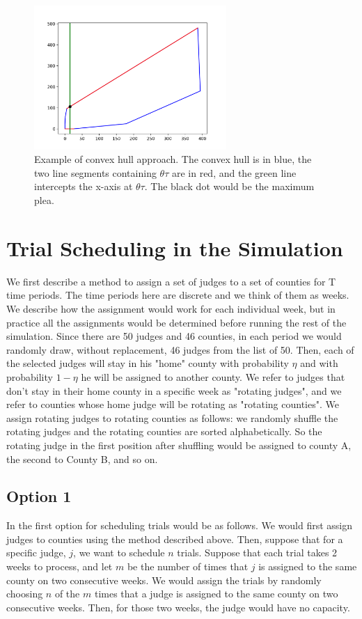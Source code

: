 \documentclass[11pt]{article}
\begin{document}
  \begin{figure}[H]
    \centering
    \includegraphics[width=0.65\textwidth]{../../../output/figures/Exploration/convex_hull_max.png}
    \caption{Example of convex hull approach. The convex hull is in blue, the two line segments containing $\theta \tau$ are in red, and the green line intercepts the x-axis at $\theta \tau$. The black dot would be the maximum plea.}
    \label{fig-convex-hull}
  \end{figure}

\section{Trial Scheduling in the Simulation}
  We first describe a method to assign a set of judges to a set of counties for T time periods. The time periods here are discrete and we think of them as weeks. We describe how the assignment would work for each individual week, but in practice all the assignments would be determined before running the rest of the simulation. Since there are 50 judges and 46 counties, in each period we would randomly draw, without replacement, 46 judges from the list of 50. Then, each of the selected judges will stay in his "home" county with probability $\eta$ and with probability $1-\eta$ he will be assigned to another county. We refer to judges that don't stay in their home county in a specific week as "rotating judges", and we refer to counties whose home judge will be rotating as "rotating counties". We assign rotating judges to rotating counties as follows: we randomly shuffle the rotating judges and the rotating counties are sorted alphabetically. So the rotating judge in the first position after shuffling would be assigned to county A, the second to County B, and so on.

  \subsection{Option 1}
    In the first option for scheduling trials would be as follows. We would first assign judges to counties using the method described above. Then, suppose that for a specific judge, $j$, we want to schedule $n$ trials. Suppose that each trial takes 2 weeks to process, and let $m$ be the number of times that $j$ is assigned to the same county on two consecutive weeks. We would assign the trials by randomly choosing $n$ of the $m$ times that a judge is assigned to the same county on two consecutive weeks. Then, for those two weeks, the judge would have no capacity.
\end{document}
